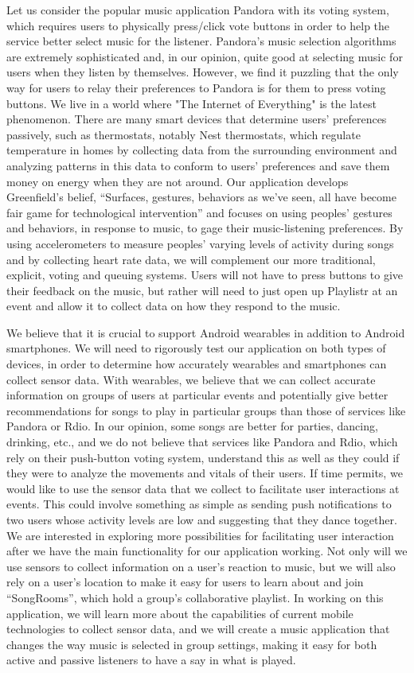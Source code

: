 \documentclass[12pt]{article}
\begin{document}
Let us consider the popular music application Pandora with its voting
system, which requires users to physically press/click vote buttons in
order to help the service better select music for the
listener. Pandora's music selection algorithms are extremely
sophisticated and, in our opinion, quite good at selecting music for
users when they listen by themselves. However, we find it puzzling
that the only way for users to relay their preferences to Pandora is
for them to press voting buttons. We live in a world where "The
Internet of Everything" is the latest phenomenon. There are many smart
devices that determine users’ preferences passively, such as
thermostats, notably Nest thermostats, which regulate temperature in
homes by collecting data from the surrounding environment and
analyzing patterns in this data to conform to users’ preferences and
save them money on energy when they are not around. Our application
develops Greenfield’s belief, “Surfaces, gestures, behaviors as we've
seen, all have become fair game for technological intervention” and
focuses on using peoples’ gestures and behaviors, in response to
music, to gage their music-listening preferences. By using
accelerometers to measure peoples’ varying levels of activity during
songs and by collecting heart rate data, we will complement our more
traditional, explicit, voting and queuing systems. Users will not have
to press buttons to give their feedback on the music, but rather will
need to just open up Playlistr at an event and allow it to collect
data on how they respond to the music.

We believe that it is crucial to support Android wearables in addition
to Android smartphones. We will need to rigorously test our
application on both types of devices, in order to determine how
accurately wearables and smartphones can collect sensor data. With
wearables, we believe that we can collect accurate information on
groups of users at particular events and potentially give better
recommendations for songs to play in particular groups than those of
services like Pandora or Rdio. In our opinion, some songs are better
for parties, dancing, drinking, etc., and we do not believe that
services like Pandora and Rdio, which rely on their push-button voting
system, understand this as well as they could if they were to analyze
the movements and vitals of their users. If time permits, we would
like to use the sensor data that we collect to facilitate user
interactions at events. This could involve something as simple as
sending push notifications to two users whose activity levels are low
and suggesting that they dance together. We are interested in
exploring more possibilities for facilitating user interaction after
we have the main functionality for our application working. Not only
will we use sensors to collect information on a user’s reaction to
music, but we will also rely on a user’s location to make it easy for
users to learn about and join “SongRooms”, which hold a group’s
collaborative playlist. In working on this application, we will learn
more about the capabilities of current mobile technologies to collect
sensor data, and we will create a music application that changes the
way music is selected in group settings, making it easy for both
active and passive listeners to have a say in what is played.
\end{document}
